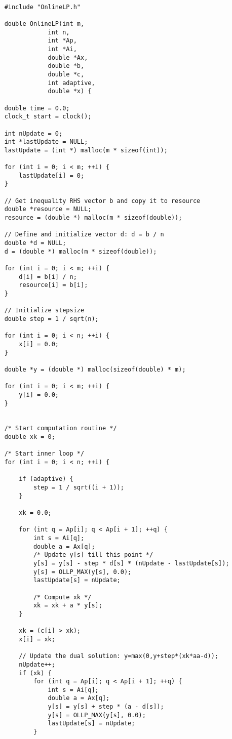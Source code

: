 \documentclass{article}
\begin{document}
\begin{lstlisting}

    #include "OnlineLP.h"
    
    double OnlineLP(int m, 
    	 	    int n, 
    	 	    int *Ap, 
    	 	    int *Ai, 
    	 	    double *Ax, 
    	 	    double *b, 
    	 	    double *c, 
    	 	    int adaptive,
    	 	    double *x) {
    
    double time = 0.0;
    clock_t start = clock();
    
    int nUpdate = 0;
    int *lastUpdate = NULL;
    lastUpdate = (int *) malloc(m * sizeof(int));
    
    for (int i = 0; i < m; ++i) {
        lastUpdate[i] = 0;
    }
    
    // Get inequality RHS vector b and copy it to resource
    double *resource = NULL;
    resource = (double *) malloc(m * sizeof(double));
    
    // Define and initialize vector d: d = b / n
    double *d = NULL;
    d = (double *) malloc(m * sizeof(double));
    
    for (int i = 0; i < m; ++i) {
        d[i] = b[i] / n;
        resource[i] = b[i];
    }
    
    // Initialize stepsize
    double step = 1 / sqrt(n);
    
    for (int i = 0; i < n; ++i) {
        x[i] = 0.0;
    }
    
    double *y = (double *) malloc(sizeof(double) * m);
    
    for (int i = 0; i < m; ++i) {
        y[i] = 0.0;
    }
    
    
    /* Start computation routine */
    double xk = 0;

    /* Start inner loop */
    for (int i = 0; i < n; ++i) {

        if (adaptive) {
            step = 1 / sqrt((i + 1));
        }

        xk = 0.0;

        for (int q = Ap[i]; q < Ap[i + 1]; ++q) {
            int s = Ai[q];
            double a = Ax[q];
            /* Update y[s] till this point */
            y[s] = y[s] - step * d[s] * (nUpdate - lastUpdate[s]);
            y[s] = OLLP_MAX(y[s], 0.0);
            lastUpdate[s] = nUpdate;

            /* Compute xk */
            xk = xk + a * y[s];
        }

        xk = (c[i] > xk);
        x[i] = xk;

        // Update the dual solution: y=max(0,y+step*(xk*aa-d));
        nUpdate++;
        if (xk) {
            for (int q = Ap[i]; q < Ap[i + 1]; ++q) {
                int s = Ai[q];
                double a = Ax[q];
                y[s] = y[s] + step * (a - d[s]);
                y[s] = OLLP_MAX(y[s], 0.0);
                lastUpdate[s] = nUpdate;
            }


\end{lstlisting}
\end{document}
